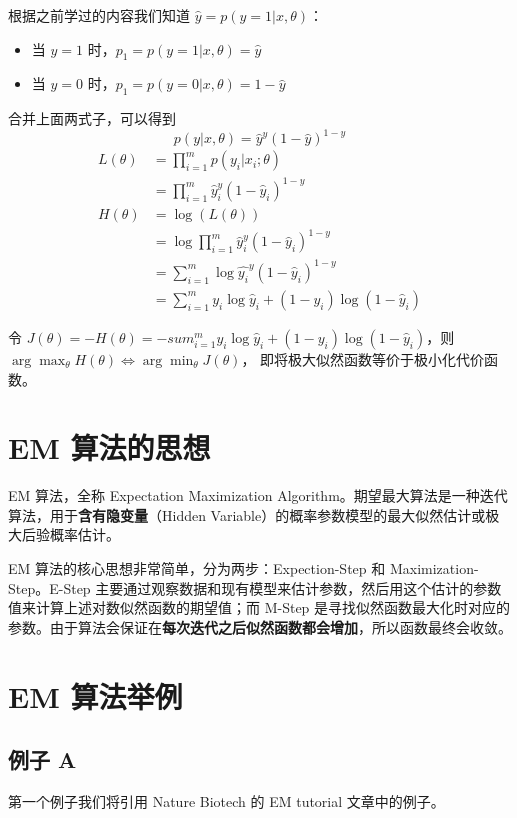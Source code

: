 \documentclass[12pt]{article}
\begin{document}
根据之前学过的内容我们知道 $\hat{y} = p(y = 1|x, \theta)$：
\begin{itemize}
\setlength{\itemsep}{0pt}
\setlength{\parsep}{0pt}
\setlength{\parskip}{0pt}
    \item 当 $y = 1$ 时，$p_1 = p(y = 1|x, \theta) = \hat{y}$
    \item 当 $y = 0$ 时，$p_1 = p(y = 0|x, \theta) = 1 - \hat{y}$
\end{itemize}

合并上面两式子，可以得到
$$
p(y|x, \theta) = \hat{y}^y(1-\hat{y})^{1-y}
$$
\begin{align*}
L(\theta) &= \prod_{i=1}^mp(y_i|x_i; \theta) \\
	&= \prod_{i=1}^m \hat{y}_i^y(1-\hat{y}_i)^{1-y} \\
H(\theta) &= \log(L(\theta)) \\
	&= \log\prod_{i=1}^m \hat{y}_i^y(1-\hat{y}_i)^{1-y}  \\
	&= \sum_{i=1}^m\log{\hat{y_i}^y(1-\hat{y}_i)^{1-y} } \\
	&= \sum_{i=1}^my_i\log \hat{y}_i + (1- y_i)\log(1-\hat{y}_i)
\end{align*}

令 $J(\theta) = -H(\theta) = -sum_{i=1}^my_i\log \hat{y}_i + (1- y_i)\log(1-\hat{y}_i)$，则 $\arg\max_\theta H(\theta) \Leftrightarrow \arg\min_\theta J(\theta)$， 即将极大似然函数等价于极小化代价函数。

\section{EM 算法的思想}
EM 算法，全称 Expectation Maximization Algorithm。期望最大算法是一种迭代算法，用于\textbf{含有隐变量}（Hidden Variable）的概率参数模型的最大似然估计或极大后验概率估计。

EM 算法的核心思想非常简单，分为两步：Expection-Step 和 Maximization-Step。E-Step 主要通过观察数据和现有模型来估计参数，然后用这个估计的参数值来计算上述对数似然函数的期望值；而 M-Step 是寻找似然函数最大化时对应的参数。由于算法会保证在\textbf{每次迭代之后似然函数都会增加}，所以函数最终会收敛。

\section{EM 算法举例}
\subsection{例子 A}
第一个例子我们将引用 Nature Biotech 的 EM tutorial 文章中的例子。
\end{document}
